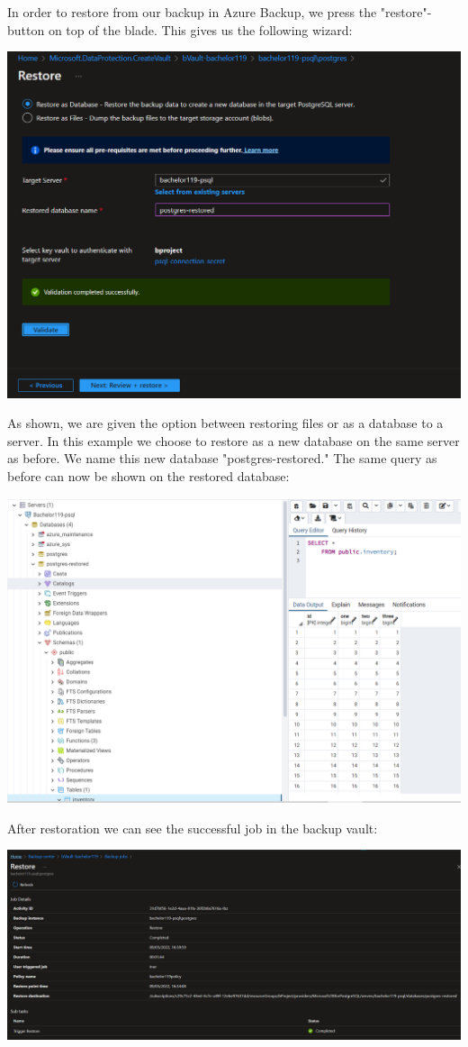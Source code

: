 In order to restore from our backup in Azure Backup, we press the "restore"-button on top of the blade. This gives us the following wizard: 

\includegraphics[width=.9\linewidth]{figures/postgresaasmund/11.PNG}

As shown, we are given the option between restoring files or as a database to a server. In this example we choose to restore as a new database on the same server as before. We name this new database "postgres-restored." The same query as before can now be shown on the restored database:

\includegraphics[width=.9\linewidth]{figures/postgresaasmund/13.PNG}

After restoration we can see the successful job in the backup vault:

\includegraphics[width=.9\linewidth]{figures/postgresaasmund/14.PNG}




